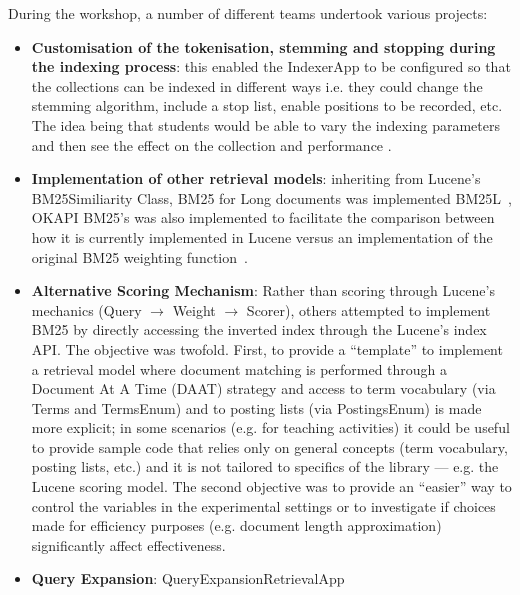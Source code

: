 During the workshop, a number of different teams undertook various projects:
\begin{itemize}
	\item {\bf Customisation of the tokenisation, stemming and stopping during the indexing process}: this enabled the IndexerApp to be configured so that the collections can be indexed in different ways i.e. they could change the stemming algorithm, include a stop list, enable positions to be recorded, etc. The idea being that students would be able to vary the indexing parameters and then see the effect on the collection and performance .
	\item {\bf Implementation of other retrieval models}: inheriting from Lucene's BM25Similiarity Class, BM25 for Long documents was implemented BM25L~\cite{Lv:2011:DVL:2009916.2010070}, OKAPI BM25's was also implemented to facilitate the comparison between how it is currently implemented in Lucene versus an implementation of the original BM25 weighting function~\cite{rup:TFXIDFRepository}.
	\item {\bf Alternative Scoring Mechanism}: Rather than scoring through Lucene's mechanics (Query $\rightarrow$ Weight $\rightarrow$ Scorer), others attempted to implement BM25 by directly accessing the inverted index through the Lucene's index API. The objective was twofold. First, to provide a ``template'' to implement a retrieval model where document matching is performed through a Document At A Time (DAAT) strategy and access to term vocabulary (via Terms and TermsEnum) and to posting lists (via PostingsEnum) is made more explicit; in some scenarios (e.g. for teaching activities) it could be useful to provide sample code that relies only on general concepts (term vocabulary, posting lists, etc.) and it is not tailored to specifics of the library --- e.g. the Lucene scoring model. The second objective was to provide an ``easier'' way to control the variables in the experimental settings or to investigate if choices made for efficiency purposes (e.g. document length approximation) significantly affect effectiveness.
	\item {\bf Query Expansion}: QueryExpansionRetrievalApp

\end{itemize}
